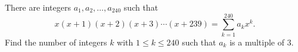There are integers $a_1,a_2,\dots,a_{240}$ such that
\[x(x+1)(x+2)(x+3)\cdots(x+239)=\sum_{k=1}^{240}a_kx^k.\]
Find the number of integers $k$ with $1\le k\le240$ such that $a_k$ is a multiple of $3$.
